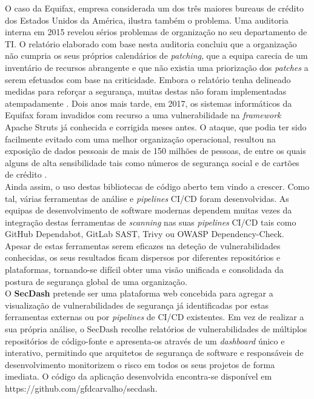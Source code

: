 O caso da Equifax, empresa considerada um dos três maiores bureaus de crédito dos Estados Unidos da América, ilustra também o problema. Uma auditoria interna em 2015 revelou sérios problemas de organização no seu departamento de TI. O relatório elaborado com base nesta auditoria concluiu que a organização não cumpria os seus próprios calendários de \textit{patching}, que a equipa carecia de um inventário de recursos abrangente e que não existia uma priorização dos \textit{patches} a serem efetuados com base na criticidade. Embora o relatório tenha delineado medidas para reforçar a segurança, muitas destas não foram implementadas atempadamente \cite{Senate_Equifax_2019}. Dois anos mais tarde, em 2017, os sistemas informáticos da Equifax foram invadidos com recurso a uma vulnerabilidade na \textit{framework} Apache Struts já conhecida e corrigida meses antes. O ataque, que podia ter sido facilmente evitado com uma melhor organização operacional, resultou na exposição de dados pessoais de mais de 150 milhões de pessoas, de entre os quais alguns de alta sensibilidade tais como números de segurança social e de cartões de crédito \cite{EPIC_Equifax_Breach}. \\

Ainda assim, o uso destas bibliotecas de código aberto tem vindo a crescer. Como tal, várias ferramentas de análise e \textit{pipelines} CI/CD foram desenvolvidas. As equipas de desenvolvimento de software modernas dependem muitas vezes da integração destas ferramentas de \textit{scanning} nas suas \textit{pipelines} CI/CD tais como GitHub Dependabot, GitLab SAST, Trivy ou OWASP Dependency-Check. Apesar de estas ferramentas serem eficazes na deteção de vulnerabilidades conhecidas, os seus resultados ficam dispersos por diferentes repositórios e plataformas, tornando-se difícil obter uma visão unificada e consolidada da postura de segurança global de uma organização. \\

O \textbf{SecDash} pretende ser uma plataforma web concebida para agregar a visualização de vulnerabilidades de segurança já identificadas por estas ferramentas externas ou por \textit{pipelines} de CI/CD existentes. Em vez de realizar a sua própria análise, o SecDash recolhe relatórios de vulnerabilidades de múltiplos repositórios de código-fonte e apresenta-os através de um \textit{dashboard} único e interativo, permitindo que arquitetos de segurança de software e responsáveis de desenvolvimento monitorizem o risco em todos os seus projetos de forma imediata. O código da aplicação desenvolvida encontra-se disponível em https://github.com/gfdcarvalho/secdash. \\

